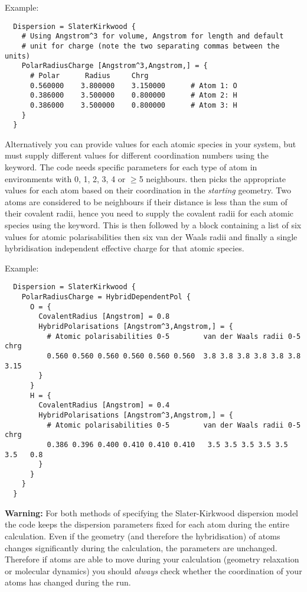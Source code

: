 Example:\invparskip
\begin{verbatim}
  Dispersion = SlaterKirkwood {
    # Using Angstrom^3 for volume, Angstrom for length and default
    # unit for charge (note the two separating commas between the units)
    PolarRadiusCharge [Angstrom^3,Angstrom,] = {
      # Polar      Radius     Chrg
      0.560000    3.800000    3.150000      # Atom 1: O
      0.386000    3.500000    0.800000      # Atom 2: H
      0.386000    3.500000    0.800000      # Atom 3: H
    }
  }
\end{verbatim}

Alternatively you can provide values for each atomic species in your
system, but must supply different values for different coordination
numbers using the  keyword. The code needs
specific parameters for each type of atom in environments with 0, 1,
2, 3, 4 or $\geqslant$5 neighbours. \dftbp{} then picks the
appropriate values for each atom based on their coordination in the
\emph{starting} geometry.  Two atoms are considered to be neighbours
if their distance is less than the sum of their covalent radii, hence
you need to supply the covalent radii for each atomic species using
the  keyword. This is then followed by a
 block containing a list of six values for
atomic polarisabilities then six van der Waals radii and finally a
single hybridisation independent effective charge for that atomic
species.

Example:\invparskip
\begin{verbatim}
  Dispersion = SlaterKirkwood {
    PolarRadiusCharge = HybridDependentPol {
      O = {
        CovalentRadius [Angstrom] = 0.8
        HybridPolarisations [Angstrom^3,Angstrom,] = {
          # Atomic polarisabilities 0-5        van der Waals radii 0-5  chrg
          0.560 0.560 0.560 0.560 0.560 0.560  3.8 3.8 3.8 3.8 3.8 3.8  3.15
        }
      }
      H = {
        CovalentRadius [Angstrom] = 0.4
        HybridPolarisations [Angstrom^3,Angstrom,] = {
          # Atomic polarisabilities 0-5        van der Waals radii 0-5  chrg
          0.386 0.396 0.400 0.410 0.410 0.410   3.5 3.5 3.5 3.5 3.5 3.5   0.8
        }
      }
    }
  }
\end{verbatim}

\textbf{Warning:} For both methods of specifying the Slater-Kirkwood dispersion model the code keeps
the dispersion parameters fixed for each atom during the entire calculation. Even if the geometry
(and therefore the hybridisation) of atoms changes significantly during the calculation, the
parameters are unchanged. Therefore if atoms are able to move during your calculation (geometry
relaxation or molecular dynamics) you should \emph{always} check whether the coordination of your
atoms has changed during the run.

